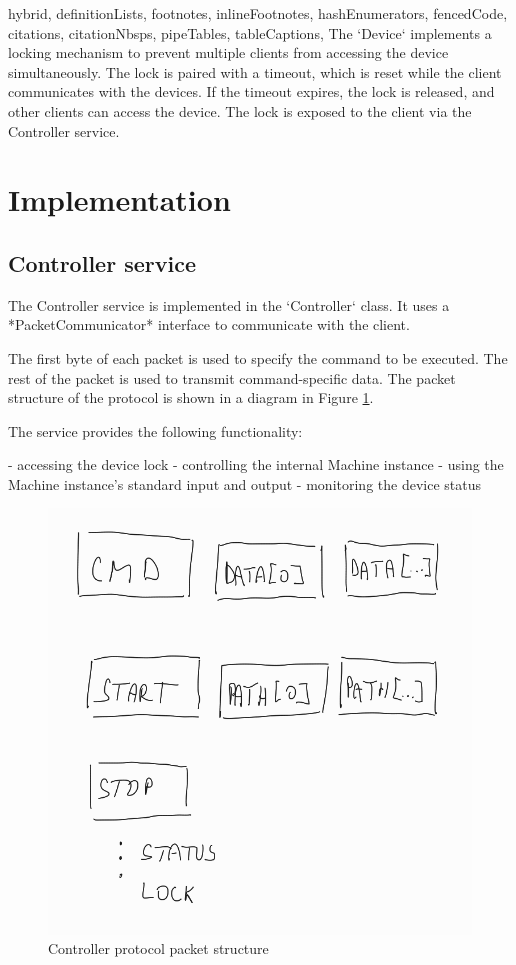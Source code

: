 \begin{markdown*}{%
  hybrid,
  definitionLists,
  footnotes,
  inlineFootnotes,
  hashEnumerators,
  fencedCode,
  citations,
  citationNbsps,
  pipeTables,
  tableCaptions,
}
The `Device` implements a locking mechanism to prevent multiple clients from accessing the device simultaneously. The lock is paired with a timeout, which is reset while the client communicates with the devices. If the timeout expires, the lock is released, and other clients can access the device. The lock is exposed to the client via the Controller service.


\section{Implementation}

\subsection{Controller service}

The Controller service is implemented in the `Controller` class. It uses a *PacketCommunicator* interface to communicate with the client.

The first byte of each packet is used to specify the command to be executed. The rest of the packet is used to transmit command-specific data. The packet structure of the protocol is shown in a diagram in Figure \ref{fig:controller-protocol}.

The service provides the following functionality:

  - accessing the device lock
  - controlling the internal Machine instance
  - using the Machine instance's standard input and output
  - monitoring the device status

\begin{figure}[!ht]
    \centering
    \includegraphics[width=\textwidth]{img/controller-protocol}
    \caption{Controller protocol packet structure}
    \label{fig:controller-protocol}
\end{figure}


\end{markdown*}

